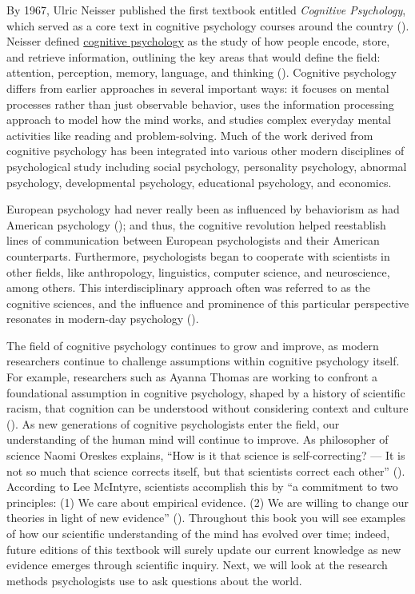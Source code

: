 \documentclass[
]{krantz}
\begin{document}
By 1967, Ulric Neisser published the first textbook entitled \emph{Cognitive Psychology}, which served as a core text in cognitive psychology courses around the country (). Neisser defined \hyperref[cognitive-psychology]{cognitive psychology} as the study of how people encode, store, and retrieve information, outlining the key areas that would define the field: attention, perception, memory, language, and thinking (). Cognitive psychology differs from earlier approaches in several important ways: it focuses on mental processes rather than just observable behavior, uses the information processing approach to model how the mind works, and studies complex everyday mental activities like reading and problem-solving. Much of the work derived from cognitive psychology has been integrated into various other modern disciplines of psychological study including social psychology, personality psychology, abnormal psychology, developmental psychology, educational psychology, and economics.

European psychology had never really been as influenced by behaviorism as had American psychology (); and thus, the cognitive revolution helped reestablish lines of communication between European psychologists and their American counterparts. Furthermore, psychologists began to cooperate with scientists in other fields, like anthropology, linguistics, computer science, and neuroscience, among others. This interdisciplinary approach often was referred to as the cognitive sciences, and the influence and prominence of this particular perspective resonates in modern-day psychology ().

The field of cognitive psychology continues to grow and improve, as modern researchers continue to challenge assumptions within cognitive psychology itself. For example, researchers such as Ayanna Thomas are working to confront a foundational assumption in cognitive psychology, shaped by a history of scientific racism, that cognition can be understood without considering context and culture (). As new generations of cognitive psychologists enter the field, our understanding of the human mind will continue to improve. As philosopher of science Naomi Oreskes explains, ``How is it that science is self-correcting? --- It is not so much that science corrects itself, but that scientists correct each other'' (). According to Lee McIntyre, scientists accomplish this by ``a commitment to two principles: (1) We care about empirical evidence. (2) We are willing to change our theories in light of new evidence'' (). Throughout this book you will see examples of how our scientific understanding of the mind has evolved over time; indeed, future editions of this textbook will surely update our current knowledge as new evidence emerges through scientific inquiry. Next, we will look at the research methods psychologists use to ask questions about the world.
\end{document}
